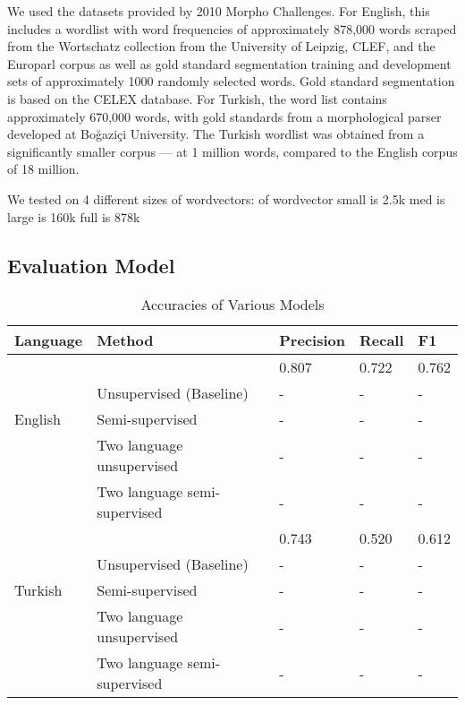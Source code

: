 \documentclass[11pt,twocolumn]{article}
\begin{document}
We used the datasets provided by 2010 Morpho Challenges. For English, this includes
a wordlist with word frequencies of approximately 878,000 words scraped from the
Wortschatz collection from the University of Leipzig, CLEF, and the Europarl corpus
as well as gold standard segmentation training and development sets of approximately 
1000 randomly selected words. Gold standard segmentation is based on the CELEX database.
For Turkish, the word list contains approximately 670,000 words, with gold standards
from a morphological parser developed at Boğaziçi University. The Turkish wordlist
was obtained from a significantly smaller corpus --- at 1 million words, compared
to the English corpus of 18 million.

We tested on 4 different sizes of wordvectors:
of wordvector 
small is 2.5k
med is 
large is 160k
full is 878k

\subsection{Evaluation Model}

\begin{table*}
    \begin{center}
        \begin{tabular}{ | l | l | l | l | l |}
            \hline
            Language & Method & Precision & Recall & F1 \\ \hline
                     & \citeauthor{Narasimhan15} & 0.807 & 0.722 & 0.762 \\ 
                     & Unsupervised (Baseline) & -  & - & - \\ 
            English & Semi-supervised & - & - & - \\ 
                    & Two language unsupervised & - & - & - \\ 
                    & Two language semi-supervised & - & - & - \\ \hline
                    & \citeauthor{Narasimhan15} & 0.743 & 0.520 & 0.612 \\ 
                    & Unsupervised (Baseline) & - & - & - \\ 
            Turkish & Semi-supervised & - & - & -  \\ 
                    & Two language unsupervised  & - & - & -  \\ 
                    & Two language semi-supervised  & - & - & -  \\ \hline
        \end{tabular}
        \caption{Accuracies of Various Models}
    \end{center}
\end{table*}
\end{document}
